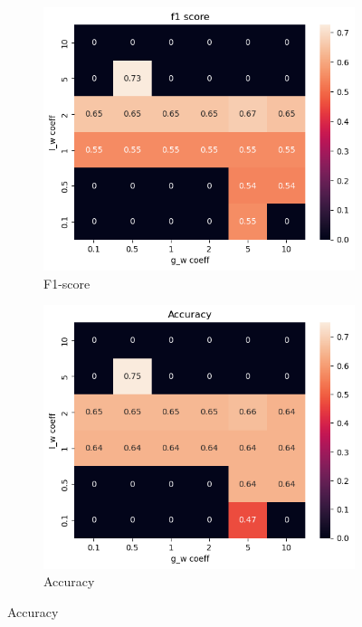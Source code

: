 \documentclass[a4paper,11pt]{article}
\begin{document}
\begin{figure}[h]
    \centering
    \begin{subfigure}{0.32\textwidth}
        \includegraphics[width=\textwidth]{figures/f1_score_results.png}
        \caption{F1-score}
        \label{fig:f1_score}
    \end{subfigure}
    \begin{subfigure}{0.32\textwidth}
        \includegraphics[width=\textwidth]{figures/accuracy_results.png}
        \caption{Accuracy}
        \label{fig:accuracy}

\end{subfigure}
\end{figure}
\end{document}
